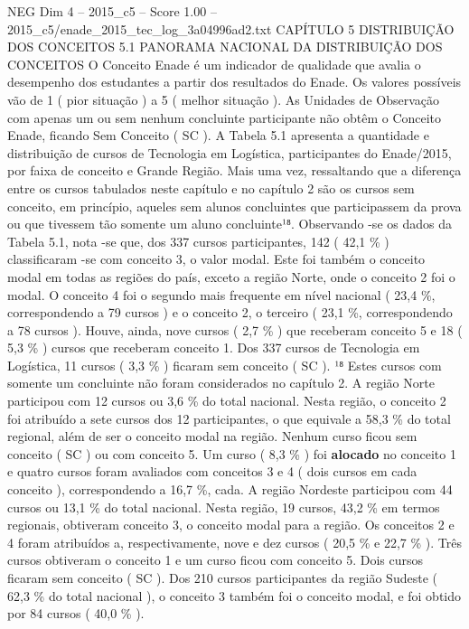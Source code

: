 \begin{textsample}{NEG Dim 4 – 2015\_c5 – Score 1.00 – 2015\_c5/enade\_2015\_tec\_log\_3a04996ad2.txt}  \label{ex:f4_neg_184}
CAPÍTULO 5 DISTRIBUIÇÃO DOS CONCEITOS 5.1 PANORAMA NACIONAL DA DISTRIBUIÇÃO DOS CONCEITOS O Conceito Enade é um indicador de qualidade que avalia o desempenho dos estudantes a partir dos resultados do Enade.
Os valores possíveis vão de 1 ( pior situação ) a 5 ( melhor situação ).
As Unidades de Observação com apenas um ou sem nenhum concluinte participante não obtêm o Conceito Enade, ficando Sem Conceito ( SC ).
A Tabela 5.1 apresenta a quantidade e distribuição de cursos de Tecnologia em Logística, participantes do Enade/2015, por faixa de conceito e Grande Região.
Mais uma vez, ressaltando que a diferença entre os cursos tabulados neste capítulo e no capítulo 2 são os cursos sem conceito, em princípio, aqueles sem alunos concluintes que participassem da prova ou que tivessem tão somente um aluno concluinte¹⁸.
Observando -se os dados da Tabela 5.1, nota -se que, dos 337 cursos participantes, 142 ( 42,1 \% ) classificaram -se com conceito 3, o valor modal.
Este foi também o conceito modal em todas as regiões do país, exceto a região Norte, onde o conceito 2 foi o modal.
O conceito 4 foi o segundo mais frequente em nível nacional ( 23,4 \%, correspondendo a 79 cursos ) e o conceito 2, o terceiro ( 23,1 \%, correspondendo a 78 cursos ).
Houve, ainda, nove cursos ( 2,7 \% ) que receberam conceito 5 e 18 ( 5,3 \% ) cursos que receberam conceito 1.
Dos 337 cursos de Tecnologia em Logística, 11 cursos ( 3,3 \% ) ficaram sem conceito ( SC ). ¹⁸ Estes cursos com somente um concluinte não foram considerados no capítulo 2.
A região Norte participou com 12 cursos ou 3,6 \% do total nacional.
Nesta região, o conceito 2 foi atribuído a sete cursos dos 12 participantes, o que equivale a 58,3 \% do total regional, além de ser o conceito modal na região.
Nenhum curso ficou sem conceito ( SC ) ou com conceito 5.
Um curso ( 8,3 \% ) foi \textbf{alocado} no conceito 1 e quatro cursos foram avaliados com conceitos 3 e 4 ( dois cursos em cada conceito ), correspondendo a 16,7 \%, cada.
A região Nordeste participou com 44 cursos ou 13,1 \% do total nacional.
Nesta região, 19 cursos, 43,2 \% em termos regionais, obtiveram conceito 3, o conceito modal para a região.
Os conceitos 2 e 4 foram atribuídos a, respectivamente, nove e dez cursos ( 20,5 \% e 22,7 \% ).
Três cursos obtiveram o conceito 1 e um curso ficou com conceito 5.
Dois cursos ficaram sem conceito ( SC ).
Dos 210 cursos participantes da região Sudeste ( 62,3 \% do total nacional ), o conceito 3 também foi o conceito modal, e foi obtido por 84 cursos ( 40,0 \% ).

\end{textsample}
